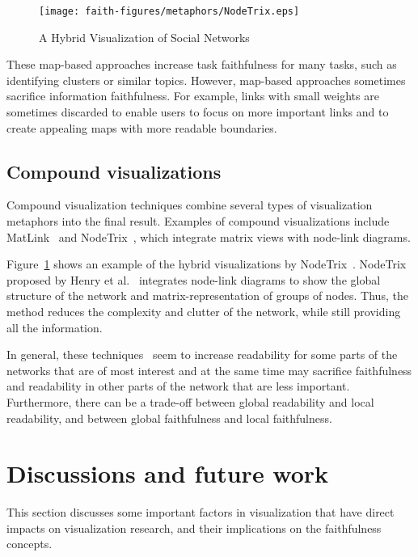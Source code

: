 \documentclass[10pt,journal,cspaper,compsoc]{IEEEtran}
\begin{document}
\begin{figure}\centering
\texttt{[image: faith-figures/metaphors/NodeTrix.eps]}
\caption{A Hybrid Visualization of Social Networks~\cite{henry2007nodetrix}}\label{fig:nodetrix1}
\end{figure}


These map-based approaches increase task faithfulness for many tasks, such as identifying clusters or similar topics. However, map-based approaches sometimes sacrifice information faithfulness. For example, links with small weights are sometimes discarded to enable users to focus on more important links and to create appealing maps with more readable boundaries.





\subsection{Compound visualizations\label{sec:compound}}
Compound visualization techniques combine several types of visualization metaphors into the final result. Examples of compound visualizations include MatLink~\cite{henry2007matlink} and NodeTrix~\cite{henry2007nodetrix}, which integrate matrix views with node-link diagrams.


Figure~\ref{fig:nodetrix1} shows an example of the hybrid visualizations by NodeTrix~\cite{henry2007nodetrix}. 
NodeTrix proposed by Henry et al.~\cite{henry2007nodetrix} integrates node-link diagrams to show the global structure of the network and matrix-representation of groups of nodes. Thus, the method reduces the complexity and clutter of the network, while still providing all the information. 


In general, these techniques~\cite{henry2007matlink,henry2007nodetrix} seem to increase readability for some parts of the networks that are of most interest and at the same time may sacrifice faithfulness and readability in other parts of the network that are less important.
Furthermore, there can be a trade-off between global readability and local readability, and between global faithfulness and local faithfulness.



\section{Discussions and future work}
This section discusses some important factors in visualization that have direct impacts on visualization research, and their implications on the faithfulness concepts.
\end{document}
